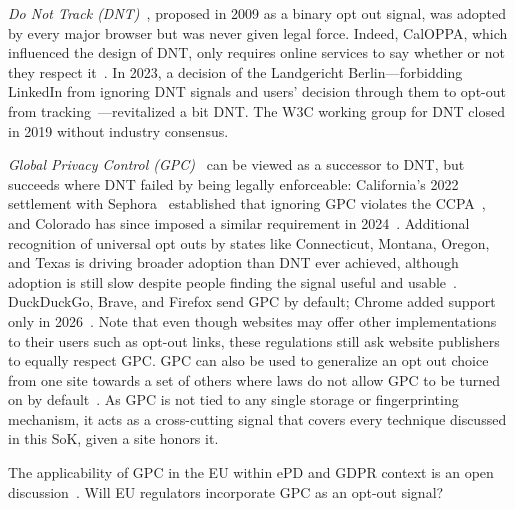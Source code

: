 \noindent
\textit{Do Not Track (DNT)}~\cite{fieldingTrackingPreferenceExpression2019}, proposed in 2009 as a binary opt out signal, was adopted by every major browser but was never given legal force.
%
Indeed, CalOPPA, which influenced the design of DNT, only requires online services to say whether or not they respect it~\cite{CaliforniaCodeBPC2003}.
%
In 2023, a decision of the Landgericht Berlin---forbidding LinkedIn from ignoring DNT signals and users' decision through them to opt-out from tracking~\cite{CourtProhibitsLinkedins2023}---revitalized a bit DNT.
%
The W3C working group for DNT closed in 2019 without industry consensus.

\noindent\textit{Global Privacy Control (GPC)}~\cite{zimmeckGlobalPrivacyControl2024} can be viewed as a successor to DNT, but succeeds where DNT failed by being legally enforceable: California's 2022 settlement with Sephora~\cite{bontaAttorneyGeneralBonta2022} established that ignoring GPC violates the CCPA~\cite{attorneygeneralbecerraCCPARequiresBusinesses2021}, and Colorado has since imposed a similar requirement in 2024~\cite{coloradodepartmentoflawUniversalOptOutShortlist2024}.
%
Additional recognition of universal opt outs by states like Connecticut, Montana, Oregon, and Texas is driving broader adoption than DNT ever achieved, although adoption is still slow despite people finding the signal useful and usable~\cite{zimmeckUsabilityEnforceabilityGlobal2023,zimmeckGeneralizableActivePrivacy2024,azizJohnnyStillCant2024}.
%
DuckDuckGo, Brave, and Firefox send GPC by default; Chrome added support only in 2026~\cite{googleGlobalPrivacyControl2025}.
%
Note that even though websites may offer other implementations to their users such as opt-out links, these regulations still ask website publishers to equally respect GPC.
%
GPC can also be used to generalize an opt out choice from one site towards a set of others where laws do not allow GPC to be turned on by default~\cite{zimmeckGeneralizableActivePrivacy2024}.
%
As GPC is not tied to any single storage or fingerprinting mechanism, it acts as a cross-cutting signal that covers every technique discussed in this SoK, given a site honors it.

\begin{opbox}
The applicability of GPC in the EU within ePD and GDPR context is an open discussion~\cite{berjonGPCGDPR2021,bielovaEffectDesignPatterns2024
}. Will EU regulators incorporate GPC as an opt-out signal?
\end{opbox}